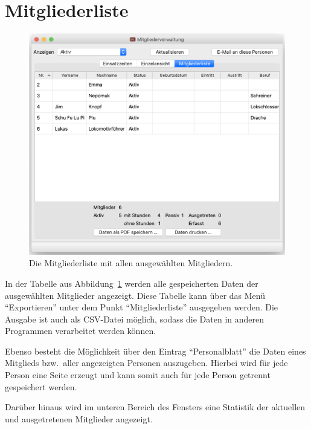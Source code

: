 \section{Mitgliederliste}\label{personal:mitglieder}
\begin{figure}[!h]
	\includegraphics[width=\textwidth]{img/mitgliederliste}
	\caption{Die Mitgliederliste mit allen ausgewählten Mitgliedern.}
	\label{fig:personal:mitglieder}
\end{figure}
In der Tabelle aus Abbildung~\ref{fig:personal:mitglieder} werden alle gespeicherten Daten der ausgewählten Mitglieder angezeigt.
Diese Tabelle kann über das Menü "`Exportieren"' unter dem Punkt "`Mitgliederliste"' ausgegeben werden.
Die Ausgabe ist auch als CSV-Datei möglich, sodass die Daten in anderen Programmen verarbeitet werden können.

Ebenso besteht die Möglichkeit über den Eintrag "`Personalblatt"' die Daten eines Mitglieds bzw.\ aller angezeigten Personen auszugeben.
Hierbei wird für jede Person eine Seite erzeugt und kann somit auch für jede Person getrennt gespeichert werden.

Darüber hinaus wird im unteren Bereich des Fensters eine Statistik der aktuellen und ausgetretenen Mitglieder angezeigt.
